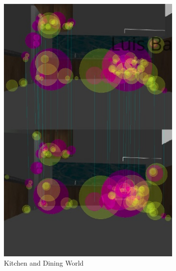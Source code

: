 \documentclass[10pt,journal,compsoc]{IEEEtran}
\begin{document}
\begin{figure}[H]
\centering
\begin{subfigure}{.5\linewidth}
  \centering
  \includegraphics[width=.95\linewidth]{kd_world_loop_closure.png}
  \caption{Kitchen and Dining World}
  \label{fig:kd-loopclosure}
\end{subfigure}%
\begin{subfigure}{.5\linewidth}
  \centering

\end{subfigure}
\end{figure}
\end{document}
